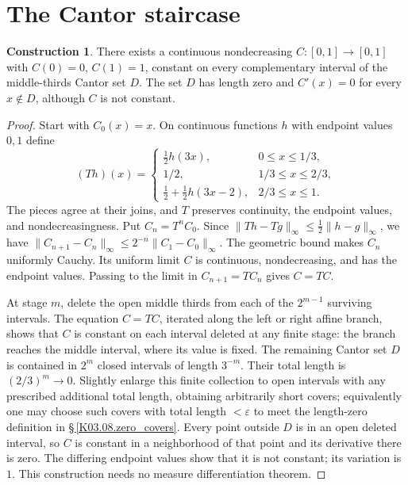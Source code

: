 \documentclass[11pt,oneside,a4paper]{book}
\theoremstyle{definition}
\newtheorem{construction}[theorem]{Construction}
\theoremstyle{remark}
\newcommand{\eps}{\varepsilon}
\newcommand{\norm}[1]{\lVert#1\rVert}
\newcommand{\KEntry}[2]{\Needspace{7\baselineskip}\section{#2}\label{#1}{\small\sffamily\color{black!60}\detokenize{#1}}\par}
\newcommand{\KRef}[1]{\hyperref[#1]{\S\,\ref*{#1}}}
\begin{document}
\KEntry{K03.15.cantor_function}{The Cantor staircase}
\begin{construction}
There exists a continuous nondecreasing $C:[0,1]\to[0,1]$ with $C(0)=0$, $C(1)=1$, constant on every complementary interval of the middle-thirds Cantor set $D$. The set $D$ has length zero and $C'(x)=0$ for every $x\notin D$, although $C$ is not constant.
\end{construction}
\begin{proof}
Start with $C_0(x)=x$. On continuous functions $h$ with endpoint values $0,1$ define
\[(Th)(x)=\begin{cases}\tfrac12h(3x),&0\leq x\leq1/3,\\1/2,&1/3\leq x\leq2/3,\\\tfrac12+\tfrac12h(3x-2),&2/3\leq x\leq1.\end{cases}\]
The pieces agree at their joins, and $T$ preserves continuity, the endpoint values, and nondecreasingness. Put $C_n=T^nC_0$. Since $\norm{Th-Tg}_\infty\leq\frac12\norm{h-g}_\infty$, we have $\norm{C_{n+1}-C_n}_\infty\leq2^{-n}\norm{C_1-C_0}_\infty$. The geometric bound makes $C_n$ uniformly Cauchy. Its uniform limit $C$ is continuous, nondecreasing, and has the endpoint values. Passing to the limit in $C_{n+1}=TC_n$ gives $C=TC$.

At stage $m$, delete the open middle thirds from each of the $2^{m-1}$ surviving intervals. The equation $C=TC$, iterated along the left or right affine branch, shows that $C$ is constant on each interval deleted at any finite stage: the branch reaches the middle interval, where its value is fixed. The remaining Cantor set $D$ is contained in $2^m$ closed intervals of length $3^{-m}$. Their total length is $(2/3)^m\to0$. Slightly enlarge this finite collection to open intervals with any prescribed additional total length, obtaining arbitrarily short covers; equivalently one may choose such covers with total length $<\eps$ to meet the length-zero definition in \KRef{K03.08.zero_covers}. Every point outside $D$ is in an open deleted interval, so $C$ is constant in a neighborhood of that point and its derivative there is zero. The differing endpoint values show that it is not constant; its variation is $1$. This construction needs no measure differentiation theorem.
\end{proof}
\end{document}
